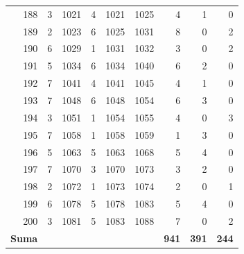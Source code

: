 \begin{longtable}{@{}rrrrrrrrr@{}}
188 & 3 & 1021 & 4 & 1021 & 1025 & 4 & 1 & 0 \\
189 & 2 & 1023 & 6 & 1025 & 1031 & 8 & 0 & 2 \\
190 & 6 & 1029 & 1 & 1031 & 1032 & 3 & 0 & 2 \\
191 & 5 & 1034 & 6 & 1034 & 1040 & 6 & 2 & 0 \\
192 & 7 & 1041 & 4 & 1041 & 1045 & 4 & 1 & 0 \\
193 & 7 & 1048 & 6 & 1048 & 1054 & 6 & 3 & 0 \\
194 & 3 & 1051 & 1 & 1054 & 1055 & 4 & 0 & 3 \\
195 & 7 & 1058 & 1 & 1058 & 1059 & 1 & 3 & 0 \\
196 & 5 & 1063 & 5 & 1063 & 1068 & 5 & 4 & 0 \\
197 & 7 & 1070 & 3 & 1070 & 1073 & 3 & 2 & 0 \\
198 & 2 & 1072 & 1 & 1073 & 1074 & 2 & 0 & 1 \\
199 & 6 & 1078 & 5 & 1078 & 1083 & 5 & 4 & 0 \\
200 & 3 & 1081 & 5 & 1083 & 1088 & 7 & 0 & 2 \\
\midrule
\textbf{Suma} & & & & & & \textbf{941} & \textbf{391} & \textbf{244} \\
\end{longtable}
\endgroup